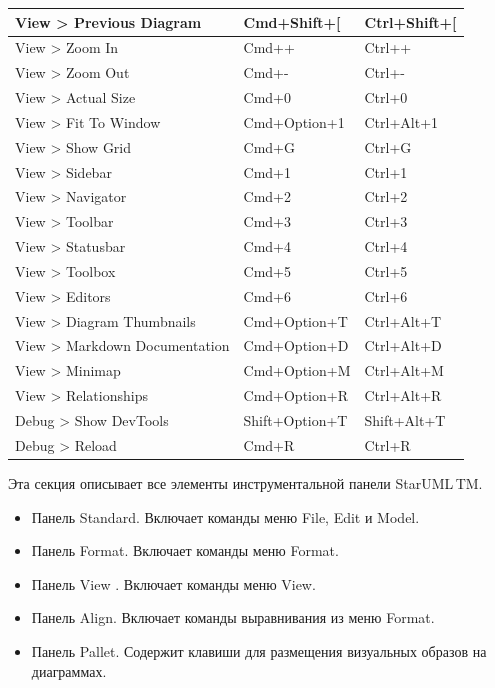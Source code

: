\documentclass[a4paper,12pt]{extreport}
\newcommand{\staruml}{StarUML\,\tm}
\begin{document}
\begin{longtable}{|l|l|l|}
			View > Previous Diagram & Cmd+Shift+[ & Ctrl+Shift+[ \\ \hline
			View > Zoom In & Cmd++ & Ctrl++ \\ \hline
			View > Zoom Out & Cmd+- & Ctrl+- \\ \hline
			View > Actual Size & Cmd+0 & Ctrl+0 \\ \hline
			View > Fit To Window & Cmd+Option+1 & Ctrl+Alt+1 \\ \hline
			View > Show Grid & Cmd+G & Ctrl+G \\ \hline
			View > Sidebar & Cmd+1 & Ctrl+1 \\ \hline
			View > Navigator & Cmd+2 & Ctrl+2 \\ \hline
			View > Toolbar & Cmd+3 & Ctrl+3 \\ \hline
			View > Statusbar & Cmd+4 & Ctrl+4 \\ \hline
			View > Toolbox & Cmd+5 & Ctrl+5 \\ \hline
			View > Editors & Cmd+6 & Ctrl+6 \\ \hline
			View > Diagram Thumbnails & Cmd+Option+T & Ctrl+Alt+T \\ \hline
			View > Markdown Documentation & Cmd+Option+D & Ctrl+Alt+D \\ \hline
			View > Minimap & Cmd+Option+M & Ctrl+Alt+M \\ \hline
			View > Relationships & Cmd+Option+R & Ctrl+Alt+R \\ \hline
			Debug > Show DevTools & Shift+Option+T & Shift+Alt+T \\ \hline
			Debug > Reload & Cmd+R & Ctrl+R \\ \hline
\end{longtable}
\normalsize

Эта секция описывает все элементы инструментальной панели \staruml TM.
\begin{itemize}
	\item Панель Standard. Включает команды меню File, Edit и Model.
	\item Панель Format. Включает команды меню Format.
	\item Панель View . Включает команды меню View.
	\item Панель Align. Включает команды выравнивания из меню Format.
	\item Панель Pallet. Содержит клавиши для размещения визуальных образов на диаграммах.
\end{itemize}
\end{document}
